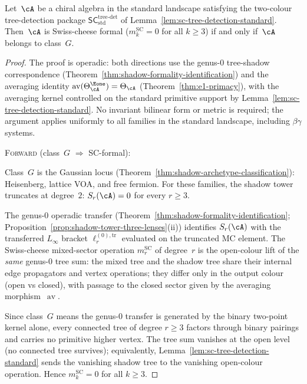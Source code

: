 \begin{proposition}
\label{prop:sc-formal-iff-class-g}
Let~$\cA$ be a chiral algebra in the standard landscape satisfying
the two-colour tree-detection package
$\mathsf{SC}^{\mathrm{tree}\text{-}\mathrm{det}}_{\mathrm{std}}$
of Lemma~\ref{lem:sc-tree-detection-standard}.
Then~$\cA$ is Swiss-cheese formal
\textup{(}$m_k^{\mathrm{SC}} = 0$ for all $k \geq 3$\textup{)}
if and only if~$\cA$ belongs to class~$G$.
\end{proposition}

\begin{proof}
The proof is operadic: both directions use the genus-$0$
tree-shadow correspondence
\textup{(}Theorem~\ref{thm:shadow-formality-identification}\textup{)}
and the averaging identity
$\operatorname{av}(\Theta_\cA^{\Eone}) = \Theta_\cA$
\textup{(}Theorem~\ref{thm:e1-primacy}\textup{)}, with the
averaging kernel controlled on the standard primitive support by
Lemma~\ref{lem:sc-tree-detection-standard}.
No invariant bilinear form or metric is required;
the argument applies uniformly to all families in the standard
landscape, including $\beta\gamma$ systems.

\medskip
\textsc{Forward} \textup{(}class~$G$ $\Longrightarrow$ SC-formal\textup{)}:

\smallskip\noindent
Class~$G$ is the Gaussian locus
\textup{(}Theorem~\ref{thm:shadow-archetype-classification}\textup{)}:
Heisenberg, lattice VOA, and free fermion. For these families,
the shadow tower truncates at degree~$2$:
$S_r(\cA) = 0$ for every $r \geq 3$.

The genus-$0$ operadic transfer
\textup{(}Theorem~\ref{thm:shadow-formality-identification};
Proposition~\ref{prop:shadow-tower-three-lenses}(ii)\textup{)}
identifies $S_r(\cA)$ with the transferred $L_\infty$ bracket
$\ell_r^{(0),\mathrm{tr}}$ evaluated on the truncated MC element.
The Swiss-cheese mixed-sector operation $m_r^{\mathrm{SC}}$ of
degree~$r$ is the open-colour lift of the \emph{same} genus-$0$
tree sum: the mixed tree and the shadow tree share their internal
edge propagators and vertex operations; they differ only in the
output colour (open vs closed), with passage to the closed sector
given by the averaging morphism~$\operatorname{av}$.

Since class~$G$ means the genus-$0$ transfer is generated by the
binary two-point kernel alone, every connected tree of degree
$r \geq 3$ factors through binary pairings and carries no
primitive higher vertex. The tree sum vanishes at the open level
(no connected tree survives); equivalently,
Lemma~\ref{lem:sc-tree-detection-standard} sends the vanishing
shadow tree to the vanishing open-colour operation.  Hence
$m_k^{\mathrm{SC}} = 0$ for all $k \geq 3$.


\end{proof}
